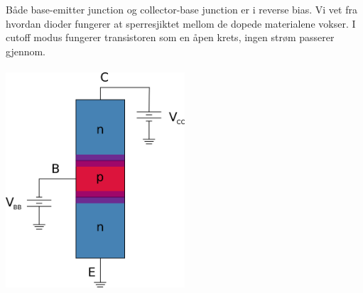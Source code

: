 Både base-emitter junction og collector-base junction
er i reverse bias.
Vi vet fra hvordan dioder fungerer at sperresjiktet
mellom de dopede materialene vokser.
I cutoff modus fungerer transistoren som en åpen krets,
ingen strøm passerer gjennom.
\\\\
\includegraphics[width=0.5\textwidth]{./img/npn-cutoff}
